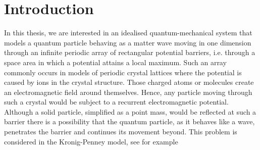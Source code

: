 \chapter{Introduction} \label{chap:1}

In this thesis, we are interested in an idealised quantum-mechanical system that models a quantum particle behaving as a matter wave moving in one dimension through an infinite periodic array of rectangular potential barriers, i.e. through a space area in which a potential attains a local maximum. Such an array commonly occurs in models of periodic crystal lattices where the potential is caused by ions in the crystal structure. Those charged atoms or molecules create an electromagnetic field around themselves. Hence, any particle moving through such a crystal would be subject to a recurrent electromagnetic potential. Although a solid particle, simplified as a point mass, would be reflected at such a barrier there is a possibility that the quantum particle, as it behaves like a wave, penetrates the barrier and continues its movement beyond. This problem is considered in the Kronig-Penney model, see for example \cite[Chapter 3]{heering2002elektrophysik}
~\\

